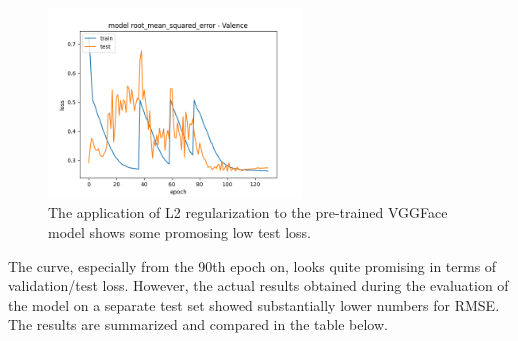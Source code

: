 \begin{figure}[H]
  \begin{center}
  \includegraphics[angle=0, width=0.6\textwidth]{Figures/rmse_out1_L2VGGFace.png}
  \caption{The application of L2 regularization to the pre-trained VGGFace model shows some promosing low test loss.}
  \label{fig:AblationL2VGGFace}
  \end{center}
\end{figure}

The curve, especially from the 90th epoch on, looks quite promising in terms of validation/test loss. However, the actual results obtained during the evaluation of the model on a separate test set showed substantially lower numbers for RMSE. The results are summarized and compared in the table below.

